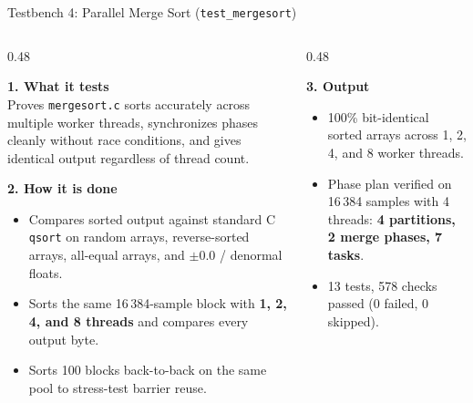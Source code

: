 \begin{frame}{Testbench 4: Parallel Merge Sort (\texttt{test\_mergesort})}
  \begin{columns}[t, onlytextwidth]
    \begin{column}{0.48\textwidth}
      \smalltext\compactitem
      \begin{highlight}
        \textbf{1. What it tests} \\
        Proves \texttt{mergesort.c} sorts accurately across multiple worker threads, synchronizes phases cleanly without race conditions, and gives identical output regardless of thread count.
      \end{highlight}
      \vskip0.5mm
      \begin{tech}
        \textbf{2. How it is done}
        \begin{itemize}
          \item Compares sorted output against standard C \texttt{qsort} on random arrays, reverse-sorted arrays, all-equal arrays, and $\pm 0.0$ / denormal floats.
          \item Sorts the same 16\,384-sample block with \textbf{1, 2, 4, and 8 threads} and compares every output byte.
          \item Sorts 100 blocks back-to-back on the same pool to stress-test barrier reuse.
        \end{itemize}
      \end{tech}
    \end{column}
    \begin{column}{0.48\textwidth}
      \smalltext\compactitem
      \begin{tech}
        \textbf{3. Output}
        \begin{itemize}
          \item 100\% bit-identical sorted arrays across 1, 2, 4, and 8 worker threads.
          \item Phase plan verified on 16\,384 samples with 4 threads: \textbf{4 partitions, 2 merge phases, 7 tasks}.
          \item \num{13 tests, 578 checks passed (0 failed, 0 skipped)}.
        \end{itemize}
      \end{tech}
      \vskip1.5mm
    \end{column}
  \end{columns}
\end{frame}

